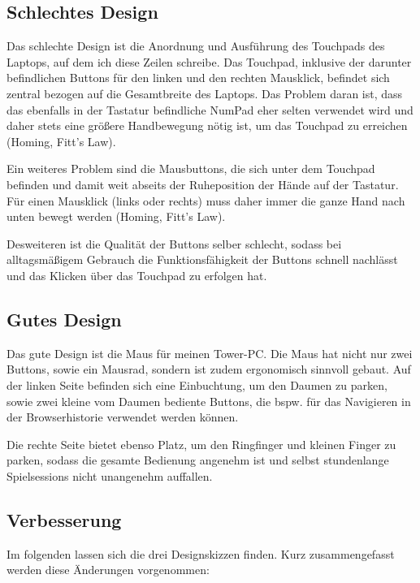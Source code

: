 \documentclass[a4paper,10pt]{scrartcl}
\begin{document}
\kopf
\renewcommand{\figurename}{Figure}


\subsection*{Schlechtes Design}

Das schlechte Design ist die Anordnung und Ausführung des Touchpads des Laptops, auf dem ich diese Zeilen schreibe. Das Touchpad, inklusive der darunter befindlichen Buttons für den linken und den rechten Mausklick, befindet sich zentral bezogen auf die Gesamtbreite des Laptops. 
Das Problem daran ist, dass das ebenfalls in der Tastatur befindliche NumPad eher selten verwendet wird und daher stets eine größere Handbewegung nötig ist, um das Touchpad zu erreichen (Homing, Fitt's Law).

Ein weiteres Problem sind die Mausbuttons, die sich unter dem Touchpad befinden und damit weit abseits der Ruheposition der Hände auf der Tastatur. Für einen Mausklick (links oder rechts) muss daher immer die ganze Hand nach unten bewegt werden (Homing, Fitt's Law).

Desweiteren ist die Qualität der Buttons selber schlecht, sodass bei alltagsmäßigem Gebrauch die Funktionsfähigkeit der Buttons schnell nachlässt und das Klicken über das Touchpad zu erfolgen hat.

\subsection*{Gutes Design}

Das gute Design ist die Maus für meinen Tower-PC. Die Maus hat nicht nur zwei Buttons, sowie ein Mausrad, sondern ist zudem ergonomisch sinnvoll gebaut.
Auf der linken Seite befinden sich eine Einbuchtung, um den Daumen zu parken, sowie zwei kleine vom Daumen bediente Buttons, die bspw. für das Navigieren in der Browserhistorie verwendet werden können.

Die rechte Seite bietet ebenso Platz, um den Ringfinger und kleinen Finger zu parken, sodass die gesamte Bedienung angenehm ist und selbst stundenlange Spielsessions nicht unangenehm auffallen.

\subsection*{Verbesserung}

Im folgenden lassen sich die drei Designskizzen finden. Kurz zusammengefasst werden diese Änderungen vorgenommen:
\end{document}
